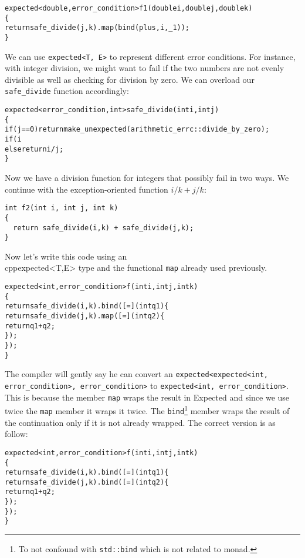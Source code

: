 \documentclass[a4paper,10pt]{article}
\newcommand{\cpp}[1]{\lstinline{#1}}
\begin{document}
\begin{alltt}
expected<double, error_condition> f1(double i, double j, double k)
\{
  return safe_divide(j, k).map(bind(plus, i, _1));
\}
\end{alltt}

We can use \cpp{expected<T, E>} to represent different error conditions. For instance, with integer division, we might want to fail if the two numbers are not evenly divisible as well as checking for division by zero. We can overload our \cpp{safe_divide} function accordingly:

\begin{alltt}
expected<error_condition, int> safe_divide(int i, int j)
\{
  if (j == 0) return make_unexpected(arithmetic_errc::divide_by_zero); 
  if (i%j != 0) return make_unexpected(arithmetic_errc::not_integer_division);
  else return i / j;
\}
\end{alltt}

Now we have a division function for integers that possibly fail in two ways. We continue with the exception-oriented function $i/k + j/k$:

\begin{lstlisting}
int f2(int i, int j, int k)
{
  return safe_divide(i,k) + safe_divide(j,k);
}
\end{lstlisting}

\noindent
Now let's write this code using an \\cpp{expected<T,E>} type and the functional \cpp{map} already used previously.

\begin{alltt}
expected<int,error_condition> f(int i, int j, int k)
\{
  return safe_divide(i, k).bind([=](int q1) \{
      return safe_divide(j,k).map([=](int q2) \{
        return q1+q2;
      \});
    \});
\}
\end{alltt}

The compiler will gently say he can convert an \cpp{expected<expected<int, error_condition>, error_condition>} to \cpp{expected<int, error_condition>}. This is because the member \cpp{map} wraps the result in Expected and since we use twice the \cpp{map} member it wraps it twice. The \cpp{bind}\footnote{To not confound with \cpp{std::bind} which is not related to monad.} member wraps the result of the continuation only if it is not already wrapped. The correct version is as follow:

\begin{alltt}
expected<int, error_condition> f(int i, int j, int k)
\{
  return safe_divide(i, k).bind([=](int q1) \{
      return safe_divide(j,k).bind([=](int q2) \{
        return q1+q2;
      \});
    \});
\}
\end{alltt}
\end{document}
